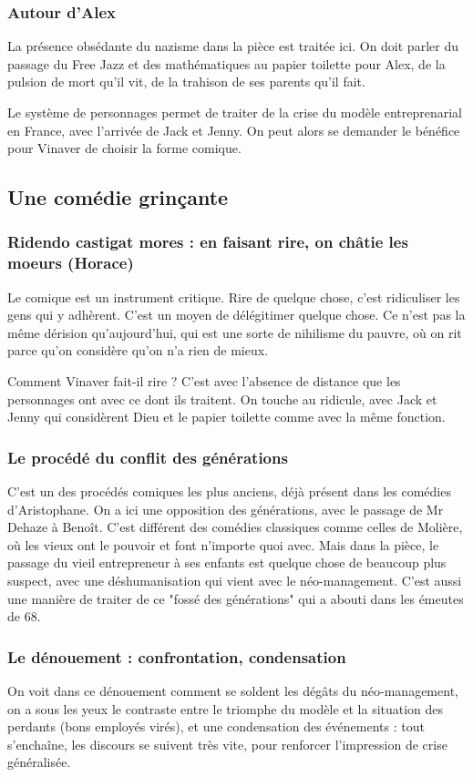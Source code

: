 \documentclass[a4paper,12pt]{book}
\begin{document}
\subsubsection{Autour d'Alex}
La présence obsédante du nazisme dans la pièce est traitée ici. On doit parler du passage du Free Jazz et des mathématiques au papier toilette pour Alex, de la pulsion de mort qu'il vit, de la trahison de ses parents qu'il fait.

\par Le système de personnages permet de traiter de la crise du modèle entreprenarial en France, avec l'arrivée de Jack et Jenny. On peut alors se demander le bénéfice pour Vinaver de choisir la forme comique.
\subsection{Une comédie grinçante}
\subsubsection{Ridendo castigat mores : en faisant rire, on châtie les moeurs (Horace)}
Le comique est un instrument critique. Rire de quelque chose, c'est ridiculiser les gens qui y adhèrent. C'est un moyen de délégitimer quelque chose. Ce n'est pas la même dérision qu'aujourd'hui, qui est une sorte de nihilisme du pauvre, où on rit parce qu'on considère qu'on n'a rien de mieux.
\par Comment Vinaver fait-il rire ? C'est avec l'absence de distance que les personnages ont avec ce dont ils traitent. On touche au ridicule, avec Jack et Jenny qui considèrent Dieu et le papier toilette comme avec la même fonction.

\subsubsection{Le procédé du conflit des générations}
C'est un des procédés comiques les plus anciens, déjà présent dans les comédies d'Aristophane. On a ici une opposition des générations, avec le passage de Mr Dehaze à Benoît. C'est différent des comédies classiques comme celles de Molière, où les vieux ont le pouvoir et font n'importe quoi avec. Mais dans la pièce, le passage du vieil entrepreneur à ses enfants est quelque chose de beaucoup plus suspect, avec une déshumanisation qui vient avec le néo-management. C'est aussi une manière de traiter de ce "fossé des générations" qui a abouti dans les émeutes de 68.

\subsubsection{Le dénouement : confrontation, condensation}
On voit dans ce dénouement comment se soldent les dégâts du néo-management, on a sous les yeux le contraste entre le triomphe du modèle et la situation des perdants (bons employés virés), et une condensation des événements : tout s'enchaîne, les discours se suivent très vite, pour renforcer l'impression de crise généralisée.
\end{document}

